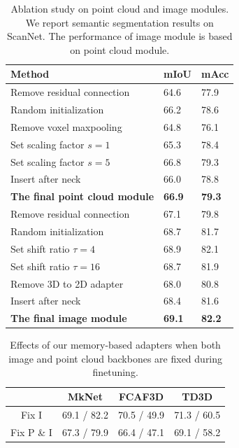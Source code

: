 \begin{table}[]
    \centering
    \setlength\tabcolsep{14pt}
    \caption{Ablation study on point cloud and image modules. We report semantic segmentation results on ScanNet. The performance of image module is based on point cloud module.}\label{tab45}
    \footnotesize
    \begin{tabular}{l|p{0.5cm}<{\centering}p{0.5cm}<{\centering}}
        \toprule
        Method & mIoU & mAcc \\
        \midrule
        Remove residual connection &64.6 &77.9 \\
        Random initialization &66.2 &78.6 \\
        Remove voxel maxpooling &64.8 &76.1 \\
        Set scaling factor $s=1$ &65.3 &78.4 \\
        Set scaling factor $s=5$ &66.8 &79.3 \\
        Insert after neck &66.0 &78.8 \\
        \textbf{The final point cloud module} &\textbf{66.9} &\textbf{79.3} \\
        \midrule
        Remove residual connection &67.1 &79.8 \\
        Random initialization &68.7 & 81.7 \\
        Set shift ratio $\tau=4$ &68.9 &82.1 \\
        Set shift ratio $\tau=16$ &68.7 &81.9 \\
        Remove 3D to 2D adapter &68.0 &80.8 \\
        Insert after neck &68.4 &81.6 \\
        \textbf{The final image module} &\textbf{69.1} &\textbf{82.2} \\
        \bottomrule
    \end{tabular}
\end{table}

\begin{table}[]
    \centering
    \setlength\tabcolsep{8pt}
    \caption{Effects of our memory-based adapters when both image and point cloud backbones are fixed during finetuning.}\label{tab6}
    \footnotesize
    \begin{tabular}{c|c|c|c}
        \toprule
         & MkNet & FCAF3D & TD3D \\
        \midrule
        Fix I &69.1 / 82.2 &70.5 / 49.9 &71.3 / 60.5 \\
        Fix P \& I &67.3 / 79.9 &66.4 / 47.1 &69.1 / 58.2 \\
        \bottomrule
    \end{tabular}
\end{table}

